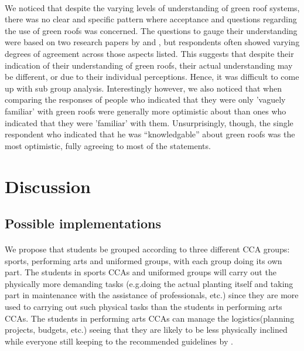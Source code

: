 \documentclass{article}
\begin{document}
\begin{multicols}{2}
  \paragraph{} We noticed that despite the varying levels of understanding
  of green roof systems, there was no clear and specific pattern
  where acceptance and questions regarding the use of green roofs was
  concerned. The questions to gauge their understanding were based on
  two research papers by \cite{HKGreenRoofGL} and \cite{energeff},
  but respondents often showed varying degrees of agreement across
  those aspects listed. This suggests that despite their indication of
  their understanding of green roofs, their actual understanding may
  be different, or due to their individual perceptions. Hence, it was
  difficult to come up with sub group analysis.  Interestingly however, we
  also noticed that when comparing the responses of people who indicated
  that they were only 'vaguely familiar' with green roofs were generally
  more optimistic about than ones who indicated that they were 'familiar'
  with them. Unsurprisingly, though, the single respondent who indicated
  that he was ``knowledgable'' about green roofs was the most optimistic,
  fully agreeing to most of the statements.






  \section{Discussion}
  \subsection{Possible implementations}
  \paragraph{} We propose that students be grouped according to three
  different CCA groups: sports, performing arts and uniformed groups,
  with each group doing its own part. The students in sports CCAs
  and uniformed groups will carry out the physically more demanding
  tasks (e.g.doing the actual planting itself and taking part in
  maintenance with the assistance of professionals, etc.) since they
  are more used to carrying out such physical tasks than the students in
  performing arts CCAs. The students in performing arts CCAs can manage
  the logistics(planning projects, budgets, etc.) seeing that they are
  likely to be less physically inclined while everyone still keeping to
  the recommended guidelines by \cite{HKGreenRoofGL}.




\end{multicols}
\end{document}
